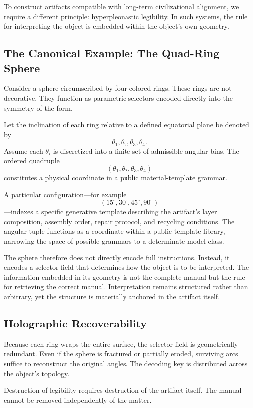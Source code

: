 \documentclass[11pt]{article}
\begin{document}
To construct artifacts compatible with long-term civilizational 
alignment, we require a different principle: hyperpleonastic legibility. 
In such systems, the rule for interpreting the object is embedded within 
the object’s own geometry.

\subsection{The Canonical Example: The Quad-Ring Sphere}

Consider a sphere circumscribed by four colored rings. These rings are 
not decorative. They function as parametric selectors encoded directly 
into the symmetry of the form.

Let the inclination of each ring relative to a defined equatorial plane 
be denoted by
\[
\theta_1, \theta_2, \theta_3, \theta_4.
\]
Assume each $\theta_i$ is discretized into a finite set of admissible 
angular bins. The ordered quadruple
\[
(\theta_1, \theta_2, \theta_3, \theta_4)
\]
constitutes a physical coordinate in a public material-template grammar.

A particular configuration—for example
\[
(15^\circ, 30^\circ, 45^\circ, 90^\circ)
\]
—indexes a specific generative template describing the artifact’s
layer composition, assembly order, repair protocol, and recycling
conditions. The angular tuple functions as a coordinate within a
public template library, narrowing the space of possible grammars
to a determinate model class.

The sphere therefore does not directly encode full instructions.
Instead, it encodes a selector field that determines how the object
is to be interpreted. The information embedded in its geometry is not
the complete manual but the rule for retrieving the correct manual.
Interpretation remains structured rather than arbitrary, yet the
structure is materially anchored in the artifact itself.

\subsection{Holographic Recoverability}

Because each ring wraps the entire surface, the selector field is 
geometrically redundant. Even if the sphere is fractured or partially 
eroded, surviving arcs suffice to reconstruct the original angles. 
The decoding key is distributed across the object’s topology.

Destruction of legibility requires destruction of the artifact itself. 
The manual cannot be removed independently of the matter.
\end{document}
